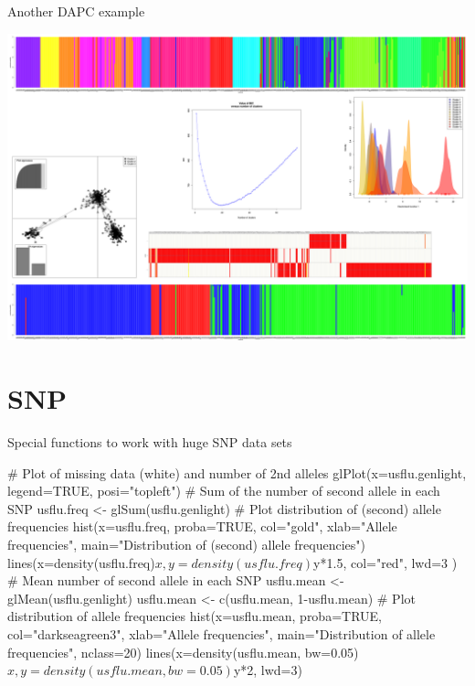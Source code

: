 \documentclass[compress, ucs, xelatex, 11pt, xcolor=svgnames,
  hyperref={
    bookmarks=true,
    unicode=true,
    colorlinks=true,
    pdftitle={Molecular data in R},
    plainpages=false,
    pdfauthor={Vojtech Zeisek},
    pdfsubject={Course about phylogeny and evolution in R},
    pdfcreator={XeLaTeX},
    pdfkeywords={R, evolution, phylogeny, molecular data},
    linkcolor=Tomato,
    anchorcolor=SaddleBrown,
    citecolor=Goldenrod,
    filecolor=DarkMagenta,
    menucolor=Sienna,
    urlcolor=DarkTurquoise,
    pdftex},
  url={hyphens, lowtilde} %
  ]{beamer}
\begin{document}
\begin{frame}{Another DAPC example}
\begin{center}
  \includegraphics[width=\textwidth-1.5cm]{dapc.png}
\end{center}
\end{frame}

\section{SNP}

\begin{frame}[fragile]{Special functions to work with huge SNP data sets}
  \begin{spluscode}
    # Plot of missing data (white) and number of 2nd alleles
    glPlot(x=usflu.genlight, legend=TRUE, posi="topleft")
    # Sum of the number of second allele in each SNP
    usflu.freq <- glSum(usflu.genlight)
    # Plot distribution of (second) allele frequencies
    hist(x=usflu.freq, proba=TRUE, col="gold", xlab="Allele
      frequencies", main="Distribution of (second) allele frequencies")
    lines(x=density(usflu.freq)$x, y=density(usflu.freq)$y*1.5,
      col="red", lwd=3 )
    # Mean number of second allele in each SNP
    usflu.mean <- glMean(usflu.genlight)
    usflu.mean <- c(usflu.mean, 1-usflu.mean)
    # Plot distribution of allele frequencies
    hist(x=usflu.mean, proba=TRUE, col="darkseagreen3",
      xlab="Allele frequencies", main="Distribution of allele
      frequencies", nclass=20)
    lines(x=density(usflu.mean, bw=0.05)$x, y=density(usflu.mean,
      bw=0.05)$y*2, lwd=3)
  \end{spluscode}
\end{frame}
\end{document}

